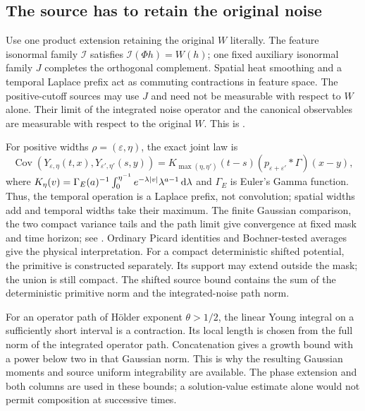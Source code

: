\subsection{The source has to retain the original
noise}\label{S:reader-retaining-source}

Use one product extension retaining the original $W$ literally. The feature
isonormal family $\mathcal{I}$ satisfies $\mathcal{I}(\Phi h) = W(h)$; one fixed
auxiliary isonormal family $J$ completes the orthogonal complement. Spatial heat
smoothing and a temporal Laplace prefix act as commuting contractions in feature
space. The positive-cutoff sources may use $J$ and need not be measurable with
respect to $W$ alone. Their limit of the integrated noise operator and the
canonical observables are measurable with respect to the original $W$. This is
.

For positive widths $\rho = (\varepsilon,\eta)$, the exact joint law is
\[
  \operatorname{Cov}(Y_{\varepsilon,\eta}(t,x),
  Y_{\varepsilon',\eta'}(s,y))
  =K_{\max(\eta,\eta')}(t-s)
  (p_{\varepsilon+\varepsilon'}*\Gamma)(x-y),
\]
where $K_\eta(v) = \Gamma_E(a)^{-1}
\int_0^{\eta^{-1}}e^{-\lambda|v|}\lambda^{a-1}\,\mathrm d\lambda$ and $\Gamma_E$ is
Euler's Gamma function. Thus, the temporal operation is a Laplace prefix, not
convolution; spatial widths add and temporal widths take their maximum. The
finite Gaussian comparison, the two compact variance tails and the path limit
give convergence at fixed mask and time horizon; see
. Ordinary Picard identities
and Bochner-tested averages give the physical interpretation. For a compact
deterministic shifted potential, the primitive is constructed separately. Its
support may extend outside the mask; the union is still compact. The shifted
source bound contains the sum of the deterministic primitive norm and the
integrated-noise path norm.

For an operator path of H\"older exponent $\theta > 1/2$, the linear Young
integral on a sufficiently short interval is a contraction. Its local length is
chosen from the full norm of the integrated operator path. Concatenation gives a
growth bound with a power below two in that Gaussian norm. This is why the
resulting Gaussian moments and source uniform integrability are available. The
phase extension and both columns are used in these bounds; a solution-value
estimate alone would not permit composition at successive times.



